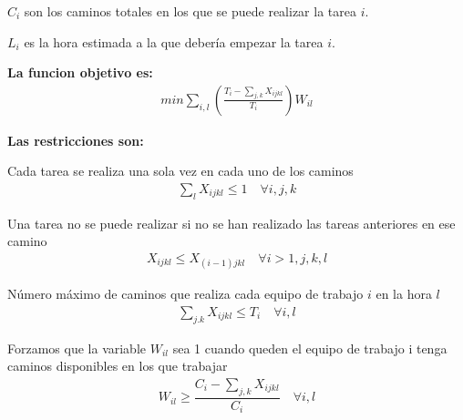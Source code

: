 $C_i$ son los caminos totales en los que se puede realizar la tarea $i$. 

$L_i$ es la hora estimada a la que debería empezar la tarea $i$. 

\textbf{La funcion objetivo es:}
\[\begin{aligned}
    min \sum_{i,l}\left( \frac{T_i-\sum_{j,k} X_{ijkl}}{T_i}\right)W_{il}
\end{aligned}\]

\textbf{Las restricciones son:}

Cada tarea se realiza una sola vez en cada uno de los caminos 
\[\begin{aligned}
\sum_{l} X_{ijkl} \leq 1 \quad \forall i,j,k
\end{aligned}\]

Una tarea no se puede realizar si no se han realizado las tareas anteriores en ese camino
\[\begin{aligned}
X_{ijkl} \leq X_{(i-1)jkl} \quad \forall i>1,j,k,l
\end{aligned}\]

Número máximo de caminos que realiza cada equipo de trabajo $i$ en la hora $l$
\[\begin{aligned}
\sum_{j.k} X_{ijkl} \leq T_i \quad \forall i,l
\end{aligned}\]

Forzamos que la variable $W_{il}$ sea 1 cuando queden el equipo de trabajo i tenga caminos disponibles en los que trabajar
\[\begin{aligned}
W_{il} \geq \dfrac{C_i-\sum_{j,k} X_{ijkl}}{C_i}  \quad \forall i,l
\end{aligned}\]
